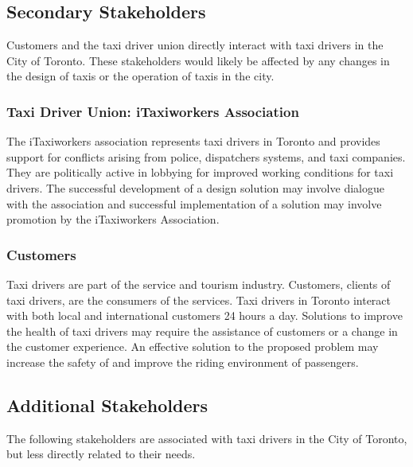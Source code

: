 \documentclass[11pt]{article}
\begin{document}
\subsection{Secondary Stakeholders} 
Customers and the taxi driver union directly interact with taxi 
drivers in the City of Toronto. These stakeholders would likely be 
affected by any changes in the design of taxis or the operation of taxis 
in the city. 

\subsubsection{Taxi Driver Union: iTaxiworkers Association}
The iTaxiworkers association represents taxi drivers in Toronto and provides 
support for conflicts arising from police, dispatchers systems, and 
taxi companies. They are politically active in lobbying for improved 
working conditions for taxi drivers. The successful development of a 
design solution may involve dialogue with the association and
successful implementation of a solution may involve promotion by the 
iTaxiworkers Association\cite{itaxi}. 


\subsubsection{Customers}
Taxi drivers are part of the service and tourism industry. Customers,
clients of taxi drivers, are the consumers of the services. Taxi 
drivers in Toronto interact with both local and international customers 
24 hours a day. Solutions to improve the health of taxi drivers 
may require the assistance of customers or a change in the customer 
experience. An effective solution to the proposed problem may increase 
the safety of and improve the riding environment of passengers. 
 
 
\subsection{Additional Stakeholders}

The following stakeholders are associated with taxi drivers in the City 
of Toronto, but less directly related to their needs. 
\end{document}

